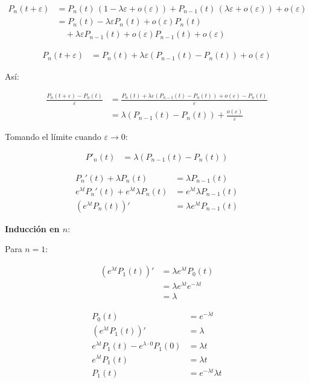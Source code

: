 \documentclass[12pt]{article}
\begin{document}
\begin{align*}
P_n(t+\varepsilon) 
&= P_n(t)\,(1 - \lambda \varepsilon + o(\varepsilon)) 
   + P_{n-1}(t)\,(\lambda \varepsilon + o(\varepsilon)) 
   + o(\varepsilon) \\
&= P_n(t) - \lambda \varepsilon P_n(t) + o(\varepsilon)P_n(t) \\
&\quad + \lambda \varepsilon P_{n-1}(t) + o(\varepsilon)P_{n-1}(t) 
   + o(\varepsilon)
\end{align*}

\begin{align*}
P_n(t+\varepsilon) &= P_n(t) + \lambda \varepsilon (P_{n-1}(t) - P_n(t)) + o(\varepsilon)
\end{align*}

Así:

\begin{align*}
\frac{P_n(t+\varepsilon) - P_n(t)}{\varepsilon} 
&= \frac{P_n(t) + \lambda \varepsilon (P_{n-1}(t) - P_n(t)) + o(\varepsilon) - P_n(t)}{\varepsilon} \\
&= \lambda (P_{n-1}(t) - P_n(t)) + \frac{o(\varepsilon)}{\varepsilon}
\end{align*}

Tomando el límite cuando $\varepsilon \to 0$:

\begin{align*}
P'_n(t) &= \lambda (P_{n-1}(t) - P_n(t))
\end{align*}

\begin{align*}
P_n'(t) + \lambda P_n(t) &= \lambda P_{n-1}(t) \\
e^{\lambda t} P_n'(t) + e^{\lambda t} \lambda P_n(t) &= e^{\lambda t} \lambda P_{n-1}(t) \\
\left(e^{\lambda t} P_n(t)\right)' &= \lambda e^{\lambda t} P_{n-1}(t)
\end{align*}

\textbf{Inducción en $n$}:

Para $n=1$:

\begin{align*}
\left(e^{\lambda t} P_1(t)\right)' &= \lambda e^{\lambda t} P_0(t) \\
                                   &= \lambda e^{\lambda t} e^{-\lambda t} \\
                                   &= \lambda
\end{align*}

\begin{align*}
P_0(t) &= e^{-\lambda t} \\
\left(e^{\lambda t} P_1(t)\right)' &= \lambda \\
e^{\lambda t} P_1(t) - e^{\lambda \cdot 0} P_1(0) &= \lambda t \\
e^{\lambda t} P_1(t) &= \lambda t \\
P_1(t) &= e^{-\lambda t} \lambda t
\end{align*}
\end{document}

